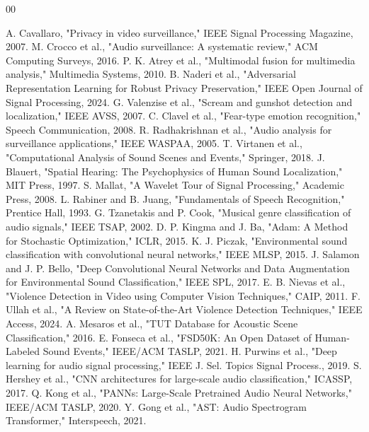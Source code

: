 \documentclass[conference]{IEEEtran}
\begin{document}
\begin{thebibliography}{00}

 A. Cavallaro, "Privacy in video surveillance," IEEE Signal Processing Magazine, 2007.
 M. Crocco et al., "Audio surveillance: A systematic review," ACM Computing Surveys, 2016.
 P. K. Atrey et al., "Multimodal fusion for multimedia analysis," Multimedia Systems, 2010.
 B. Naderi et al., "Adversarial Representation Learning for Robust Privacy Preservation," IEEE Open Journal of Signal Processing, 2024.
 G. Valenzise et al., "Scream and gunshot detection and localization," IEEE AVSS, 2007.
 C. Clavel et al., "Fear-type emotion recognition," Speech Communication, 2008.
 R. Radhakrishnan et al., "Audio analysis for surveillance applications," IEEE WASPAA, 2005.
 T. Virtanen et al., "Computational Analysis of Sound Scenes and Events," Springer, 2018.
 J. Blauert, "Spatial Hearing: The Psychophysics of Human Sound Localization," MIT Press, 1997.
 S. Mallat, "A Wavelet Tour of Signal Processing," Academic Press, 2008.
 L. Rabiner and B. Juang, "Fundamentals of Speech Recognition," Prentice Hall, 1993.
 G. Tzanetakis and P. Cook, "Musical genre classification of audio signals," IEEE TSAP, 2002.
 D. P. Kingma and J. Ba, "Adam: A Method for Stochastic Optimization," ICLR, 2015.
 K. J. Piczak, "Environmental sound classification with convolutional neural networks," IEEE MLSP, 2015.
 J. Salamon and J. P. Bello, "Deep Convolutional Neural Networks and Data Augmentation for Environmental Sound Classification," IEEE SPL, 2017.
 E. B. Nievas et al., "Violence Detection in Video using Computer Vision Techniques," CAIP, 2011.
 F. Ullah et al., "A Review on State-of-the-Art Violence Detection Techniques," IEEE Access, 2024.
 A. Mesaros et al., "TUT Database for Acoustic Scene Classification," 2016.
 E. Fonseca et al., "FSD50K: An Open Dataset of Human-Labeled Sound Events," IEEE/ACM TASLP, 2021.
 H. Purwins et al., "Deep learning for audio signal processing," IEEE J. Sel. Topics Signal Process., 2019.
 S. Hershey et al., "CNN architectures for large-scale audio classification," ICASSP, 2017.
 Q. Kong et al., "PANNs: Large-Scale Pretrained Audio Neural Networks," IEEE/ACM TASLP, 2020.
 Y. Gong et al., "AST: Audio Spectrogram Transformer," Interspeech, 2021.

\end{thebibliography}
\end{document}
